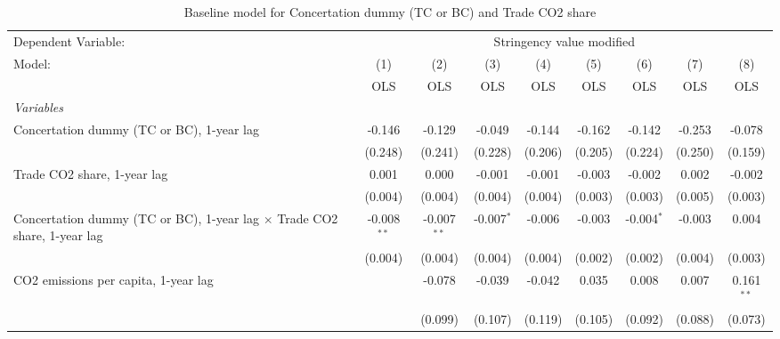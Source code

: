 
\begin{table}[htbp]
   \caption{Baseline model for Concertation dummy (TC or BC) and Trade CO2 share}
   \centering
   \begin{tabular}{lcccccccc}
      \toprule
      Dependent Variable: & \multicolumn{8}{c}{Stringency value modified}\\
      Model:                                                                          & (1)           & (2)           & (3)          & (4)         & (5)     & (6)          & (7)         & (8)\\  
                                                                                      &  OLS          & OLS           & OLS          & OLS         & OLS     & OLS          & OLS         & OLS\\  
      \midrule
      \emph{Variables}\\
      Concertation dummy (TC or BC), 1-year lag                                       & -0.146        & -0.129        & -0.049       & -0.144      & -0.162  & -0.142       & -0.253      & -0.078\\   
                                                                                      & (0.248)       & (0.241)       & (0.228)      & (0.206)     & (0.205) & (0.224)      & (0.250)     & (0.159)\\   
      Trade CO2 share, 1-year lag                                                     & 0.001         & 0.000         & -0.001       & -0.001      & -0.003  & -0.002       & 0.002       & -0.002\\   
                                                                                      & (0.004)       & (0.004)       & (0.004)      & (0.004)     & (0.003) & (0.003)      & (0.005)     & (0.003)\\   
      Concertation dummy (TC or BC), 1-year lag $\times$ Trade CO2 share, 1-year lag  & -0.008$^{**}$ & -0.007$^{**}$ & -0.007$^{*}$ & -0.006      & -0.003  & -0.004$^{*}$ & -0.003      & 0.004\\   
                                                                                      & (0.004)       & (0.004)       & (0.004)      & (0.004)     & (0.002) & (0.002)      & (0.004)     & (0.003)\\   
      CO2 emissions per capita, 1-year lag                                            &               & -0.078        & -0.039       & -0.042      & 0.035   & 0.008        & 0.007       & 0.161$^{**}$\\   
                                                                                      &               & (0.099)       & (0.107)      & (0.119)     & (0.105) & (0.092)      & (0.088)     & (0.073)\\   

\end{tabular}
\end{table}
